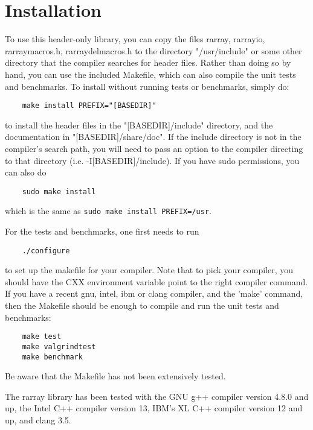 \documentclass[11pt,twoside]{article}
\begin{document}
\pagebreak
\appendix

\section{Installation}

To use this header-only library, you can copy the files rarray, rarrayio,
rarraymacros.h, rarraydelmacros.h to the directory "/usr/include" or
some other directory that the compiler searches for header files.
Rather than doing so by hand, you can use the included Makefile, which
can also compile the unit tests and benchmarks.  To install without
running tests or benchmarks, simply do:

\begin{verbatim}
    make install PREFIX="[BASEDIR]"
\end{verbatim}
to install the header files in the "[BASEDIR]/include" directory, and
the documentation in \linebreak "[BASEDIR]/share/doc".  If the include directory
is not in the compiler's search path, you will need to pass an option
to the compiler directing to that directory
(i.e. -I[BASEDIR]/include). If you have sudo permissions, you can also do
\begin{verbatim}
    sudo make install
\end{verbatim}
which is the same as \texttt{sudo make install PREFIX=/usr}.

For the tests and benchmarks, one first needs to run
\begin{verbatim}
    ./configure
\end{verbatim}
to set up the makefile for your compiler. 
Note that to pick your compiler, you should have the CXX environment
variable point to the right compiler command. 
If you have a recent gnu, intel, ibm or clang compiler, and the 'make'
command, then the Makefile should be enough to compile and run the
unit tests and benchmarks:
\begin{verbatim}
    make test
    make valgrindtest
    make benchmark
\end{verbatim}
Be aware that the Makefile has not been extensively tested.

The rarray library has been tested with the GNU g++ compiler version
4.8.0 and up, the Intel C++ compiler version 13, IBM's XL C++ compiler
version 12 and up, and clang 3.5.
\end{document}
